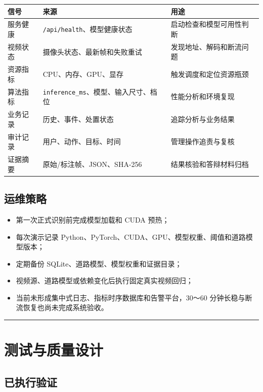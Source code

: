 \begin{longtable}[]{@{}lll@{}}
\toprule\noalign{}
信号 & 来源 & 用途 \\
\midrule\noalign{}
\endhead
\bottomrule\noalign{}
\endlastfoot
服务健康 & \texttt{/\allowbreak{}api/\allowbreak{}health}、模型健康状态 & 启动检查和模型可用性判断 \\
视频状态 & 摄像头状态、最新帧和失败重试 & 发现地址、解码和断流问题 \\
资源指标 & CPU、内存、GPU、显存 & 触发调度和定位资源瓶颈 \\
算法指标 & \texttt{inference\_\allowbreak{}ms}、模型、输入尺寸、档位 & 性能分析和环境复现 \\
业务记录 & 历史、事件、处置状态 & 追踪分析与业务结果 \\
审计记录 & 用户、动作、目标、时间 & 管理操作追责与复核 \\
证据摘要 & 原始/标注帧、JSON、SHA-256 & 结果核验和答辩材料归档 \\
\end{longtable}

\subsection{运维策略}\label{design-ux8fd0ux7ef4ux7b56ux7565}

\begin{itemize}
\tightlist
\item
  第一次正式识别前完成模型加载和 CUDA 预热；
\item
  每次演示记录 Python、PyTorch、CUDA、GPU、模型权重、阈值和道路模型版本；
\item
  定期备份 SQLite、道路模型、模型权重和证据目录；
\item
  视频源、道路模型或依赖变化后执行固定真实视频回归；
\item
  当前未形成集中式日志、指标时序数据库和告警平台，30～60 分钟长稳与断流恢复也尚未完成系统验收。
\end{itemize}

\begin{center}\rule{0.5\linewidth}{0.5pt}\end{center}

\section{测试与质量设计}\label{design-ux6d4bux8bd5ux4e0eux8d28ux91cfux8bbeux8ba1}

\subsection{已执行验证}\label{design-ux5df2ux6267ux884cux9a8cux8bc1}

